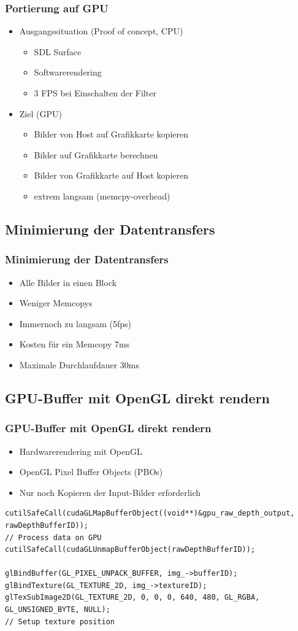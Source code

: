 \documentclass[compress]{beamer}
\begin{document}
\begin{frame}
\frametitle{Portierung auf GPU}
\begin{itemize}
\item Ausgangssituation (Proof of concept, CPU)
	\begin{itemize}
		\item SDL Surface
		\item Softwarerendering
		\item 3 FPS bei Einschalten der Filter
	\end{itemize}
\item Ziel (GPU)
	\begin{itemize}
		\item Bilder von Host auf Grafikkarte kopieren
		\item Bilder auf Grafikkarte berechnen
		\item Bilder von Grafikkarte auf Host kopieren
		\item extrem langsam (memcpy-overhead)
	\end{itemize}
\end{itemize}
\end{frame}

\subsection{Minimierung der Datentransfers}
\begin{frame}
\frametitle{Minimierung der Datentransfers}
\begin{itemize}
\item Alle Bilder in einen Block
\item Weniger Memcopys
\item Immernoch zu langsam (5fps)
\item Kosten für ein Memcopy 7ms
\item Maximale Durchlaufdauer 30ms
\end{itemize}
\end{frame}

\subsection{GPU-Buffer mit OpenGL direkt rendern}
\begin{frame}[fragile]
\frametitle{GPU-Buffer mit OpenGL direkt rendern}
\begin{itemize}
\item Hardwarerendering mit OpenGL
\item OpenGL Pixel Buffer Objects (PBOs)
\item Nur noch Kopieren der Input-Bilder erforderlich
\end{itemize}
\begin{lstlisting}
cutilSafeCall(cudaGLMapBufferObject((void**)&gpu_raw_depth_output, rawDepthBufferID));
// Process data on GPU
cutilSafeCall(cudaGLUnmapBufferObject(rawDepthBufferID));

glBindBuffer(GL_PIXEL_UNPACK_BUFFER, img_->bufferID);
glBindTexture(GL_TEXTURE_2D, img_->textureID);
glTexSubImage2D(GL_TEXTURE_2D, 0, 0, 0, 640, 480, GL_RGBA, GL_UNSIGNED_BYTE, NULL);
// Setup texture position
\end{lstlisting}
\end{frame}
\end{document}
